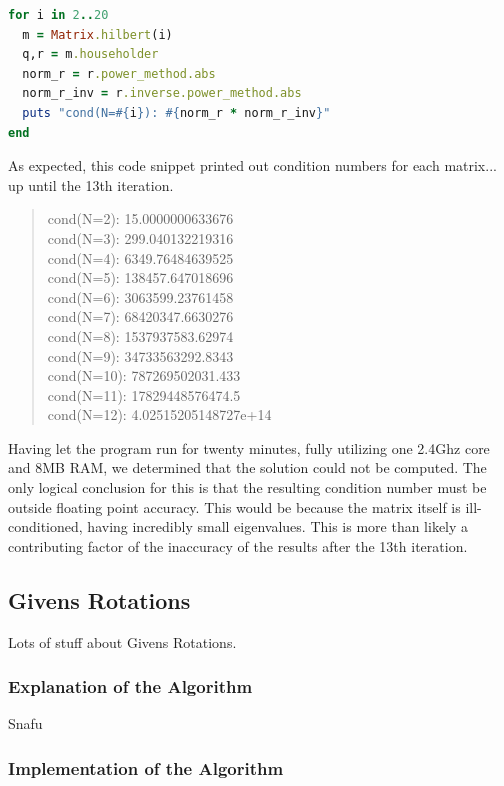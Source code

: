 \documentclass[letterpaper,12pt]{article}
\begin{document}
\lstset{caption=Determining cond(R)}
\begin{lstlisting}[language=ruby]
for i in 2..20
  m = Matrix.hilbert(i)
  q,r = m.householder
  norm_r = r.power_method.abs
  norm_r_inv = r.inverse.power_method.abs
  puts "cond(N=#{i}): #{norm_r * norm_r_inv}"
end
\end{lstlisting}

As expected, this code snippet printed out condition numbers for each matrix...
up until the 13th iteration.

\begin{quote}
cond(N=2):  15.0000000633676\\
cond(N=3):  299.040132219316\\
cond(N=4):  6349.76484639525\\
cond(N=5):  138457.647018696\\
cond(N=6):  3063599.23761458\\
cond(N=7):  68420347.6630276\\
cond(N=8):  1537937583.62974\\
cond(N=9):  34733563292.8343\\
cond(N=10): 787269502031.433\\
cond(N=11): 17829448576474.5\\
cond(N=12): 4.02515205148727e+14
\end{quote}

Having let the program run for twenty minutes, fully utilizing one 2.4Ghz core
and 8MB RAM, we determined that the solution could not be computed.
The only logical conclusion for this is that the resulting condition number
must be outside floating point accuracy.
This would be because the matrix itself is ill-conditioned, having incredibly
small eigenvalues.
This is more than likely a contributing factor of the inaccuracy of the results
after the 13th iteration.

\subsection{Givens Rotations}

Lots of stuff about Givens Rotations.

\subsubsection{Explanation of the Algorithm}

Snafu

\subsubsection{Implementation of the Algorithm}
\end{document}

